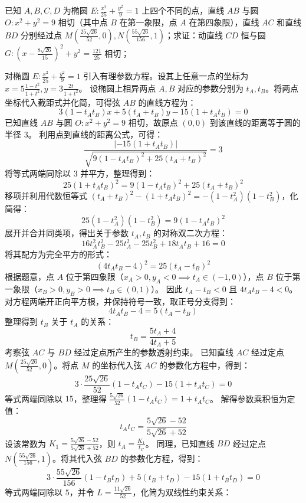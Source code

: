 \begin{example}
 已知 \(A,B,C,D\) 为椭圆 \(E: \frac{x^2}{25} + \frac{y^2}{9} = 1\) 上四个不同的点，直线 \(AB\) 与圆 \(O: x^2 + y^2 = 9\) 相切（其中点 \(B\) 在第一象限，点 \(A\) 在第四象限），直线 \(AC\) 和直线 \(BD\) 分别经过点 \(M\left(\frac{25\sqrt{26}}{52},0\right),N\left(\frac{55\sqrt{26}}{156},1\right)\)；求证：动直线 \(CD\) 恒与圆 \(G: \left(x - \frac{8\sqrt{26}}{15}\right)^2 + y^2 = \frac{121}{25}\) 相切；
\end{example}
\begin{solution}
对椭圆 $E: \frac{x^2}{25} + \frac{y^2}{9} = 1$ 引入有理参数方程。设其上任意一点的坐标为 $x = 5 \frac{1-t^2}{1+t^2}, y = 3 \frac{2t}{1+t^2}$。
设椭圆上相异两点 $A, B$ 对应的参数分别为 $t_A, t_B$。将两点坐标代入截距式并化简，可得弦 $AB$ 的直线方程为：
$$ 3(1 - t_A t_B)x + 5(t_A + t_B)y - 15(1 + t_A t_B) = 0 $$
已知直线 $AB$ 与圆 $O: x^2 + y^2 = 9$ 相切，故原点 $(0,0)$ 到该直线的距离等于圆的半径 $3$。
利用点到直线的距离公式，可得：
$$ \frac{|-15(1 + t_A t_B)|}{\sqrt{9(1 - t_A t_B)^2 + 25(t_A + t_B)^2}} = 3 $$
将等式两端同除以 $3$ 并平方，整理得到：
$$ 25(1 + t_A t_B)^2 = 9(1 - t_A t_B)^2 + 25(t_A + t_B)^2 $$
移项并利用代数恒等式 $(t_A + t_B)^2 - (1 + t_A t_B)^2 = -(1 - t_A^2)(1 - t_B^2)$，化简得：
$$ 25(1 - t_A^2)(1 - t_B^2) = 9(1 - t_A t_B)^2 $$
展开并合并同类项，得出关于参数 $t_A, t_B$ 的对称双二次方程：
$$ 16 t_A^2 t_B^2 - 25 t_A^2 - 25 t_B^2 + 18 t_A t_B + 16 = 0 $$
将其配方为完全平方的形式：
$$ (4 t_A t_B - 4)^2 = 25(t_A - t_B)^2 $$
根据题意，点 $A$ 位于第四象限（$x_A > 0, y_A < 0 \implies t_A \in (-1, 0)$），点 $B$ 位于第一象限（$x_B > 0, y_B > 0 \implies t_B \in (0, 1)$）。
因此 $t_A - t_B < 0$ 且 $4 t_A t_B - 4 < 0$。对方程两端开正向平方根，并保持符号一致，取正号分支得到：
$$ 4 t_A t_B - 4 = 5(t_A - t_B) $$
整理得到 $t_B$ 关于 $t_A$ 的关系：
$$ t_B = \frac{5t_A + 4}{4t_A + 5} $$
考察弦 $AC$ 与 $BD$ 经过定点所产生的参数透射约束。
已知直线 $AC$ 经过定点 $M\left(\frac{25\sqrt{26}}{52}, 0\right)$。将点 $M$ 的坐标代入弦 $AC$ 的参数化方程中，得到：
$$ 3 \cdot \frac{25\sqrt{26}}{52} (1 - t_A t_C) - 15(1 + t_A t_C) = 0 $$
等式两端同除以 $15$，整理得 $\frac{5\sqrt{26}}{52}(1 - t_A t_C) = 1 + t_A t_C$。
解得参数乘积恒为定值：
$$ t_A t_C = \frac{5\sqrt{26} - 52}{5\sqrt{26} + 52} $$
设该常数为 $K_1 = \frac{5\sqrt{26} - 52}{5\sqrt{26} + 52}$，则 $t_A = \frac{K_1}{t_C}$。
同理，已知直线 $BD$ 经过定点 $N\left(\frac{55\sqrt{26}}{156}, 1\right)$。将其代入弦 $BD$ 的参数化方程，得到：
$$ 3 \cdot \frac{55\sqrt{26}}{156} (1 - t_B t_D) + 5(t_B + t_D) - 15(1 + t_B t_D) = 0 $$
等式两端同除以 $5$，并令 $L = \frac{11\sqrt{26}}{52}$，化简为双线性约束关系：

\end{solution}
